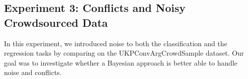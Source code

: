 % 
% 
% 
% 
% 
%  

\subsection{Experiment 3: Conflicts and Noisy Crowdsourced Data}

In this experiment, we introduced 
noise to both the classification and the regression tasks by 
comparing on the UKPConvArgCrowdSample dataset.
Our goal was to investigate whether a Bayesian approach is better able to handle noise and conflicts. 

